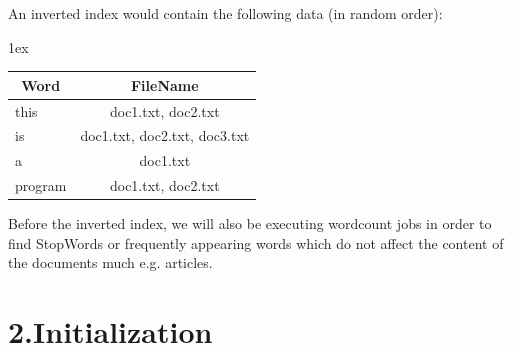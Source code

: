 \documentclass{article}
\begin{document}
\noindent An inverted index would contain the following data (in random order):%
\begin{mdtabular}{2}{}{1ex}%
\begin{tabular}{lc}\midrule
\multicolumn{1}{|c}{{\bfseries Word}}&\multicolumn{1}{c|}{{\bfseries FileName}}\\

\midrule
\multicolumn{1}{|l}{this}&\multicolumn{1}{c|}{doc1.txt, doc2.txt}\\
\multicolumn{1}{|l}{is}&\multicolumn{1}{c|}{doc1.txt, doc2.txt, doc3.txt}\\
\multicolumn{1}{|l}{a}&\multicolumn{1}{c|}{doc1.txt}\\
\multicolumn{1}{|l}{program}&\multicolumn{1}{c|}{doc1.txt, doc2.txt}\\
\midrule
\end{tabular}\end{mdtabular}

\noindent Before the inverted index, we will also be executing wordcount jobs in order to find StopWords or frequently appearing words which do not affect the content of the documents much e.g. articles.%

\section{2.\hspace*{0.5em}Initialization}\label{heading}%
\end{document}
